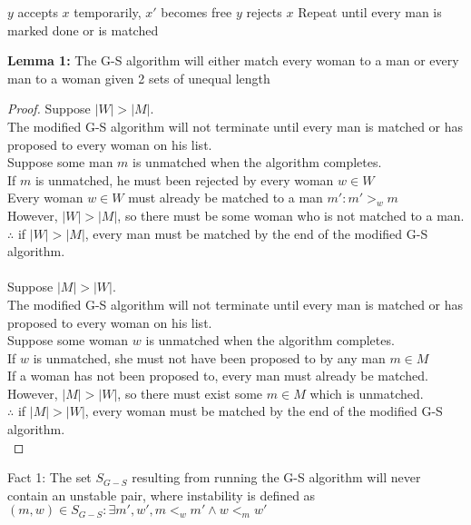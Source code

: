 \begin{problem}
\begin{algorithmic}[1]
        \STATE $y$ accepts $x$ temporarily, $x'$ becomes free
        \ELSE
        \STATE $y$ rejects $x$
        \ENDIF
      \ENDIF
      \STATE Repeat until every man is marked done or is matched
    \end{algorithmic}
    \textbf{Lemma 1:} The G-S algorithm will either match every woman to a man or every man to a woman given 2 sets of unequal length
    \begin{proof}
      Suppose $|W| > |M|$. \\
      The modified G-S algorithm will not terminate until every man is matched or has proposed to every woman on his list. \\
      Suppose some man $m$ is unmatched when the algorithm completes. \\
      If $m$ is unmatched, he must been rejected by every woman $w \in W$ \\
      Every woman $w \in W$ must already be matched to a man $m': m' >_{w} m$ \\
      However, $|W| > |M|$, so there must be some woman who is not matched to a man. \\
      $\therefore$ if $|W| > |M|$, every man must be matched by the end of the modified G-S algorithm. \\\\
      Suppose $|M| > |W|$. \\
      The modified G-S algorithm will not terminate until every man is matched or has proposed to every woman on his list. \\
      Suppose some woman $w$ is unmatched when the algorithm completes. \\
      If $w$ is unmatched, she must not have been proposed to by any man $m \in M$ \\
      If a woman has not been proposed to, every man must already be matched. \\
      However, $|M| > |W|$, so there must exist some $m \in M$ which is unmatched. \\
      $\therefore$ if $|M| > |W|$, every woman must be matched by the end of the modified G-S algorithm. \\
    \end{proof}
    \noindent
    Fact 1: The set $S_{G-S}$ resulting from running the G-S algorithm will never contain an unstable pair, where instability is defined as $(m,w) \in S_{G-S} : \exists m', w', m <_{w} m' \land w <_{m} w'$ \\

\end{problem}
